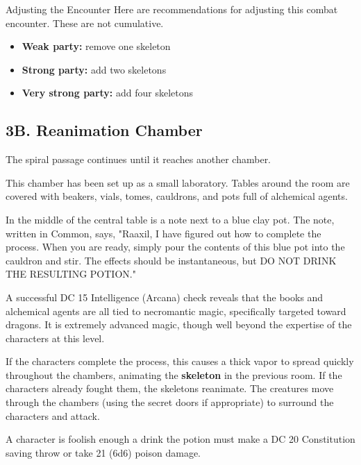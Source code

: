 \documentclass[10pt,a4paper,twoside,bg=print,twocolumn,openany,nodeprecatedcode]{dndbook}
\begin{document}
\begin{DndSidebar}[float=!b]{Adjusting the Encounter}
Here are recommendations for adjusting this combat encounter. These are not cumulative.




\begin{itemize}
\item \textbf{Weak party:} remove one skeleton
\item \textbf{Strong party:} add two skeletons
\item \textbf{Very strong party:} add four skeletons
\end{itemize}



\end{DndSidebar}

\subsection{3B. Reanimation Chamber}
The spiral passage continues until it reaches another chamber.

\begin{DndReadAloud}{}
This chamber has been set up as a small laboratory. Tables around the room are covered with beakers, vials, tomes, cauldrons, and pots full of alchemical agents.

In the middle of the central table is a note next to a blue clay pot. The note, written in Common, says, "Raaxil, I have figured out how to complete the process. When you are ready, simply pour the contents of this blue pot into the cauldron and stir. The effects should be instantaneous, but DO NOT DRINK THE RESULTING POTION."

\end{DndReadAloud}

A successful DC 15 Intelligence (Arcana) check reveals that the books and alchemical agents are all tied to necromantic magic, specifically targeted toward dragons. It is extremely advanced magic, though well beyond the expertise of the characters at this level.

If the characters complete the process, this causes a thick vapor to spread quickly throughout the chambers, animating the \textbf{skeleton} in the previous room. If the characters already fought them, the skeletons reanimate. The creatures move through the chambers (using the secret doors if appropriate) to surround the characters and attack.

A character is foolish enough a drink the potion must make a DC 20 Constitution saving throw or take 21 (6d6) poison damage.
\end{document}
